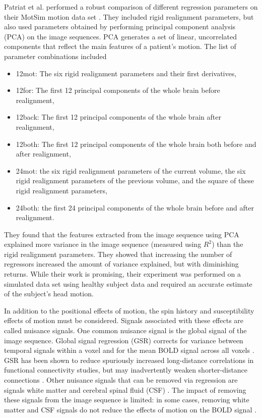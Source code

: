 Patriat et al. performed a robust comparison of different regression parameters on their MotSim motion data set \cite{Patriat2017}. They included rigid realignment parameters, but also used parameters obtained by performing principal component analysis (PCA) on the image sequences. PCA generates a set of linear, uncorrelated components that reflect the main features of a patient's motion. The list of parameter combinations included 
\begin{itemize}
\item 12mot: The six rigid realignment parameters and their first derivatives,
\item 12for: The first 12 principal components of the whole brain before realignment,
\item 12back: The first 12 principal components of the whole brain after realignment,
\item 12both: The first 12 principal components of the whole brain both before and after realignment,
\item 24mot: the six rigid realignment parameters of the current volume, the six rigid realignment parameters of the previous volume, and the square of these rigid realignment parameters,
\item 24both: the first 24 principal components of the whole brain before and after realignment.
\end{itemize}

\noindent They found that the features extracted from the image sequence using PCA explained more variance in the image sequence (measured using $R^2$) than the rigid realignment parameters. They showed that increasing the number of regressors increased the amount of variance explained, but with diminishing returns. While their work is promising, their experiment was performed on a simulated data set using healthy subject data and required an accurate estimate of the subject's head motion.

In addition to the positional effects of motion, the spin history and susceptibility effects of motion must be considered. Signals associated with these effects are called nuisance signals. One common nuisance signal is the global signal of the image sequence. Global signal regression (GSR) corrects for variance between temporal signals within a voxel and for the mean BOLD signal across all voxels \cite{Power2014} \cite{Satterthwaite2013} \cite{Yan2013} \cite{Yan2013a}. GSR has been shown to reduce spuriously increased long-distance correlations in functional connectivity studies, but may inadvertently weaken shorter-distance connections \cite{Jo2013} \cite{Power2014}  \cite{Satterthwaite2012}. Other nuisance signals that can be removed via regression are signals white matter and cerebral spinal fluid (CSF) \cite{Power2014} \cite{Satterthwaite2013}. The impact of removing these signals from the image sequence is limited: in some cases, removing white matter and CSF signals do not reduce the effects of motion on the BOLD signal \cite{Yan2013a} \cite{Jo2010}.

